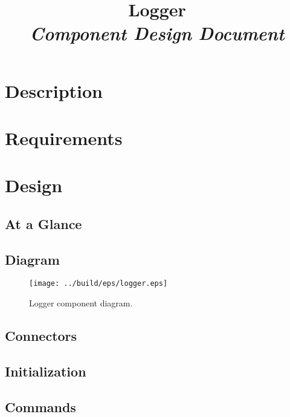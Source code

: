 



\title{\textbf{Logger} \\
\large\textit{Component Design Document}}
\date{}
\maketitle

\section{Description}


\section{Requirements}


\section{Design}

\subsection{At a Glance}


\subsection{Diagram}
\begin{figure}[H]
  \texttt{[image: ../build/eps/logger.eps]}
  \caption{Logger component diagram.}
\end{figure}

\subsection{Connectors}


\subsection{Initialization}


\subsection{Commands}

